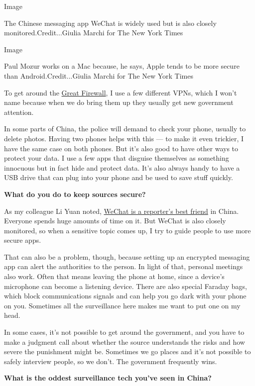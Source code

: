 Image

The Chinese messaging app WeChat is widely used but is also closely
monitored.Credit...Giulia Marchi for The New York Times

Image

Paul Mozur works on a Mac because, he says, Apple tends to be more
secure than Android.Credit...Giulia Marchi for The New York Times

To get around the
\href{https://www.nytimes3xbfgragh.onion/2018/08/10/technology/tech-infowars-china-great-firewall.html}{Great
Firewall}, I use a few different VPNs, which I won't name because when
we do bring them up they usually get new government attention.

In some parts of China, the police will demand to check your phone,
usually to delete photos. Having two phones helps with this --- to make
it even trickier, I have the same case on both phones. But it's also
good to have other ways to protect your data. I use a few apps that
disguise themselves as something innocuous but in fact hide and protect
data. It's also always handy to have a USB drive that can plug into your
phone and be used to save stuff quickly.

\textbf{What do you do to keep sources secure?}

As my colleague Li Yuan noted,
\href{https://www.nytimes3xbfgragh.onion/2019/01/09/technology/personaltech/china-wechat.html}{WeChat
is a reporter's best friend} in China. Everyone spends huge amounts of
time on it. But WeChat is also closely monitored, so when a sensitive
topic comes up, I try to guide people to use more secure apps.

That can also be a problem, though, because setting up an encrypted
messaging app can alert the authorities to the person. In light of that,
personal meetings also work. Often that means leaving the phone at home,
since a device's microphone can become a listening device. There are
also special Faraday bags, which block communications signals and can
help you go dark with your phone on you. Sometimes all the surveillance
here makes me want to put one on my head.

In some cases, it's not possible to get around the government, and you
have to make a judgment call about whether the source understands the
risks and how severe the punishment might be. Sometimes we go places and
it's not possible to safely interview people, so we don't. The
government frequently wins.

\textbf{What is the oddest surveillance tech you've seen in China?}

